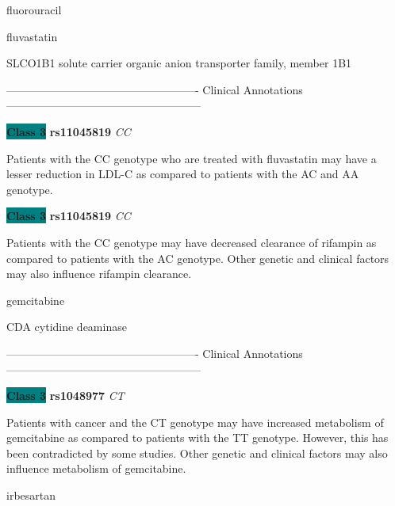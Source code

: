 \documentclass{resume} %
\begin{document}
\begin{rSection}{ fluorouracil }
\end{rSection}\begin{rSection}{ fluvastatin }
\item[]

\begin{rSubsection}{ SLCO1B1 }{ solute carrier organic anion transporter family, member 1B1 }{}{}
\item[]

\item[] ---------------------------------------------------- Clinical Annotations -----------------------------------------------------\newline
\item \textbf{\colorbox{teal} {Class 3}} \textbf{ rs11045819 } \textit{ CC }
\item[] Patients with the CC genotype who are treated with fluvastatin may have a lesser reduction in LDL-C as compared to patients with the AC and AA genotype.\item \textbf{\colorbox{teal} {Class 3}} \textbf{ rs11045819 } \textit{ CC }
\item[] Patients with the CC genotype may have decreased clearance of rifampin as compared to patients with the AC genotype. Other genetic and clinical factors may also influence rifampin clearance. 
\end{rSubsection}

\end{rSection}\begin{rSection}{ gemcitabine }
\item[]

\begin{rSubsection}{ CDA }{ cytidine deaminase }{}{}
\item[]

\item[] ---------------------------------------------------- Clinical Annotations -----------------------------------------------------\newline
\item \textbf{\colorbox{teal} {Class 3}} \textbf{ rs1048977 } \textit{ CT }
\item[] Patients with cancer and the CT genotype may have increased metabolism of gemcitabine as compared to patients with the TT genotype. However, this has been contradicted by some studies. Other genetic and clinical factors may also influence metabolism of gemcitabine. 
\end{rSubsection}

\end{rSection}\begin{rSection}{ irbesartan }
\item[]


\end{rSection}
\end{document}
